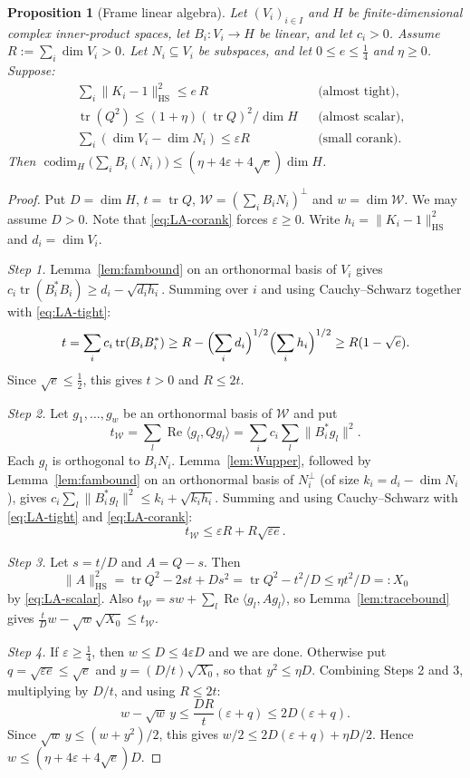\documentclass[10pt]{amsart}
\newtheorem{proposition}[theorem]{Proposition}
\theoremstyle{definition}
\theoremstyle{remark}
\newcommand{\Rel}{\operatorname{Re}}
\begin{document}
\begin{proposition}[Frame linear algebra]\label{prop:frameLA}
Let $(V_i)_{i\in I}$ and $H$ be finite-dimensional complex inner-product spaces, let $B_i\colon V_i\to H$ be linear, and let $c_i>0$. Assume $R:=\sum_i\dim V_i>0$. Let $N_i\subseteq V_i$ be subspaces, and let $0\le e\le\frac14$ and $\eta\ge0$. Suppose:
\begin{align}
&\textstyle\sum_i\|K_i-1\|_{\mathrm{HS}}^2\le e\,R && \text{(almost tight)},\label{eq:LA-tight}\\
&\operatorname{tr}(Q^2)\le(1+\eta)(\operatorname{tr}Q)^2/\dim H && \text{(almost scalar)},\label{eq:LA-scalar}\\
&\textstyle\sum_i(\dim V_i-\dim N_i)\le\varepsilon R && \text{(small corank)}.\label{eq:LA-corank}
\end{align}
Then $\operatorname{codim}_H\bigl(\sum_iB_i(N_i)\bigr)\le(\eta+4\varepsilon+4\sqrt e)\dim H$.
\end{proposition}

\begin{proof}
Put $D=\dim H$, $t=\operatorname{tr}Q$, $\mathcal W=(\sum_iB_iN_i)^\perp$ and $w=\dim\mathcal W$. We may assume $D>0$. Note that \eqref{eq:LA-corank} forces $\varepsilon\ge0$. Write $h_i=\|K_i-1\|_{\mathrm{HS}}^2$ and $d_i=\dim V_i$.

\emph{Step 1.} Lemma~\ref{lem:fambound} on an orthonormal basis of $V_i$ gives $c_i\operatorname{tr}(B_i^*B_i)\ge d_i-\sqrt{d_ih_i}$. Summing over $i$ and using Cauchy--Schwarz together with \eqref{eq:LA-tight}:
\[
t=\sum_ic_i\operatorname{tr}(B_iB_i^*)\ge R-\Bigl(\sum_id_i\Bigr)^{1/2}\Bigl(\sum_ih_i\Bigr)^{1/2}\ge R(1-\sqrt e).
\]
Since $\sqrt e\le\frac12$, this gives $t>0$ and $R\le2t$.

\emph{Step 2.} Let $g_1,\dots,g_w$ be an orthonormal basis of $\mathcal W$ and put
\[
t_{\mathcal W}=\sum_l\Rel\langle g_l,Qg_l\rangle=\sum_ic_i\sum_l\|B_i^*g_l\|^2 .
\]
Each $g_l$ is orthogonal to $B_iN_i$. Lemma~\ref{lem:Wupper}, followed by Lemma~\ref{lem:fambound} on an orthonormal basis of $N_i^\perp$ (of size $k_i=d_i-\dim N_i$), gives $c_i\sum_l\|B_i^*g_l\|^2\le k_i+\sqrt{k_ih_i}$. Summing and using Cauchy--Schwarz with \eqref{eq:LA-tight} and \eqref{eq:LA-corank}:
\[
t_{\mathcal W}\le\varepsilon R+R\sqrt{\varepsilon e}.
\]

\emph{Step 3.} Let $s=t/D$ and $A=Q-s$. Then
\[
\|A\|_{\mathrm{HS}}^2=\operatorname{tr}Q^2-2st+Ds^2=\operatorname{tr}Q^2-t^2/D\le\eta t^2/D=:X_0
\]
by \eqref{eq:LA-scalar}. Also $t_{\mathcal W}=sw+\sum_l\Rel\langle g_l,Ag_l\rangle$, so Lemma~\ref{lem:tracebound} gives $\frac tDw-\sqrt w\sqrt{X_0}\le t_{\mathcal W}$.

\emph{Step 4.} If $\varepsilon\ge\frac14$, then $w\le D\le4\varepsilon D$ and we are done. Otherwise put $q=\sqrt{\varepsilon e}\le\sqrt e$ and $y=(D/t)\sqrt{X_0}$, so that $y^2\le\eta D$. Combining Steps 2 and 3, multiplying by $D/t$, and using $R\le2t$:
\[
w-\sqrt w\,y\le\frac{DR}{t}(\varepsilon+q)\le2D(\varepsilon+q).
\]
Since $\sqrt w\,y\le(w+y^2)/2$, this gives $w/2\le2D(\varepsilon+q)+\eta D/2$. Hence $w\le(\eta+4\varepsilon+4\sqrt e)D$.
\end{proof}
\end{document}
